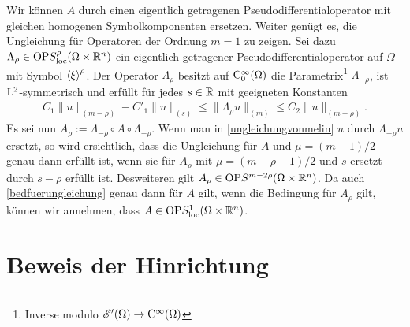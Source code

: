 Wir können $A$ durch einen eigentlich getragenen Pseudodifferentialoperator mit gleichen homogenen Symbolkomponenten ersetzen.  Weiter genügt es, die Ungleichung für Operatoren der Ordnung $m=1$ zu zeigen. Sei dazu $\Lambda_\rho\in\mathrm{OP}S^\rho_{\rm loc}(\Omega\times\mathbb R^n)$ ein eigentlich getragener Pseudodifferentialoperator auf $\Omega$ mit Symbol $\braket\xi^\rho$.
Der Operator $\Lambda_\rho$ besitzt auf $\mathrm C_0^\infty(\Omega)$ die Parametrix\footnote{Inverse modulo $\mathscr E'(\Omega)\to\mathrm C^\infty(\Omega)$}  $\Lambda_{-\rho}$, ist $\mathrm L^2$-symmetrisch und erfüllt für jedes $s\in\mathbb R$ mit geeigneten Konstanten
\begin{align}
   C_1 \|u\|_{(m-\rho)} - C'_1 \|u\|_{(s)} \le    \|\Lambda_\rho u\|_{(m)} \le   C_2 \|u\|_{(m-\rho)}.
\end{align}
Es sei nun $A_\rho:=\Lambda_{-\rho} \circ A\circ\Lambda_{-\rho}$. Wenn man in \eqref{ungleichungvonmelin} $u$ durch $\Lambda_{-\rho} u$ ersetzt, so wird ersichtlich, dass die Ungleichung für $A$ und $\mu=(m-1)/2$ genau dann erfüllt ist, wenn sie für $A_\rho$ mit $\mu=(m-\rho-1)/2$ und $s$ ersetzt durch $s-\rho$ erfüllt ist. Desweiteren gilt $A_\rho\in \mathrm{OP}S^{m-2\rho}(\Omega\times\mathbb R^n)$. 
Da auch \eqref{bedfuerungleichung} genau dann für $A$ gilt, wenn die Bedingung für $A_\rho$ gilt, können wir annehmen, dass $A\in\mathrm{OP}S^1_{\rm loc}(\Omega\times\mathbb R^n)$.


\section{Beweis der Hinrichtung}

